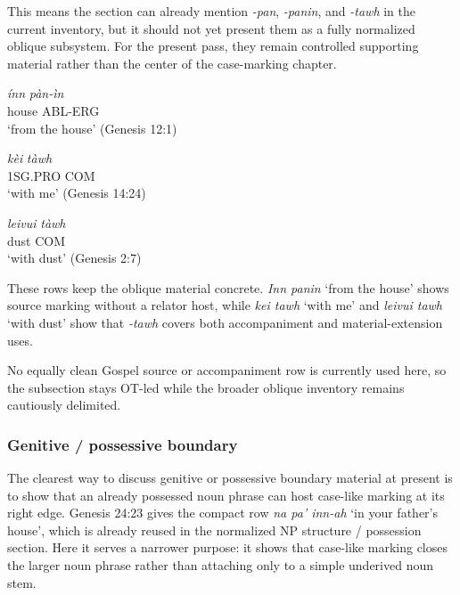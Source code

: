 \documentclass[
  11pt,
  a4paper,
]{article}
\newcommand{\tdim}[1]{\textit{#1}}
\newcommand{\tdimword}[1]{\textit{#1}}
\renewcommand{\textsc}[1]{{\footnotesize\MakeUppercase{#1}}}
\newcommand{\glossquote}[1]{`#1'}
\begin{document}
This means the section can already mention \tdim{-pan}, \tdim{-panin},
and \tdim{-tawh} in the current inventory, but it should not yet present
them as a fully normalized oblique subsystem. For the present pass, they
remain controlled supporting material rather than the center of the
case-marking chapter.

\begin{exe}
\ex \label{ex:case-panin-inn}
\gll \tdimword{ínn} \tdimword{pàn-ìn} \\
     house \textsc{abl}-\textsc{erg} \\
\glt \glossquote{from the house} (Genesis 12:1)
\end{exe}

\begin{exe}
\ex \label{ex:case-tawh-kei}
\gll \tdimword{kèi} \tdimword{tàwh} \\
     \textsc{1sg}.\textsc{pro} \textsc{com} \\
\glt \glossquote{with me} (Genesis 14:24)
\end{exe}

\begin{exe}
\ex \label{ex:case-tawh-leivui}
\gll \tdimword{leivui} \tdimword{tàwh} \\
     dust \textsc{com} \\
\glt \glossquote{with dust} (Genesis 2:7)
\end{exe}

These rows keep the oblique material concrete. \tdim{Inn panin}
\glossquote{from the house} shows source marking without a relator host,
while \tdim{kei tawh} \glossquote{with me} and \tdim{leivui tawh}
\glossquote{with dust} show that \tdim{-tawh} covers both accompaniment
and material-extension uses.

No equally clean Gospel source or accompaniment row is currently used
here, so the subsection stays OT-led while the broader oblique inventory
remains cautiously delimited.

\subsubsection{Genitive / possessive
boundary}\label{genitive-possessive-boundary}

The clearest way to discuss genitive or possessive boundary material at
present is to show that an already possessed noun phrase can host
case-like marking at its right edge. Genesis 24:23 gives the compact row
\tdim{na pa' inn-ah} \glossquote{in your father's house}, which is
already reused in the normalized NP structure / possession section. Here
it serves a narrower purpose: it shows that case-like marking closes the
larger noun phrase rather than attaching only to a simple underived noun
stem.
\end{document}
